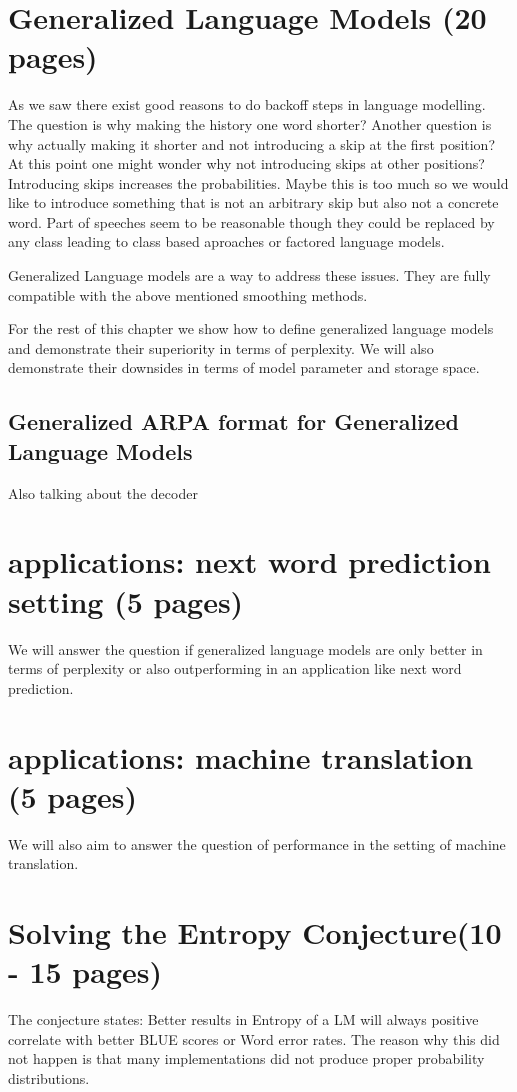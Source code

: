 \documentclass[•]{book}
\begin{document}
\chapter{Generalized Language Models (20 pages)}
As we saw there exist good reasons to do backoff steps in language modelling. 
The question is why making the history one word shorter?
Another question is why actually making it shorter and not introducing a skip at the first position?
At this point one might wonder why not introducing skips at other positions? 
Introducing skips increases the probabilities. 
Maybe this is too much so we would like to introduce something that is not an arbitrary skip but also not a concrete word. Part of speeches seem to be reasonable though they could be replaced by any class leading to class based aproaches\cite{CLASS:BASED:LMS} or factored language models\cite{FACTORED:LANGUAGE:MODEL}.

Generalized Language models are a way to address these issues. 
They are fully compatible with the above mentioned smoothing methods. 

For the rest of this chapter we show how to define generalized language models and demonstrate their superiority in terms of perplexity. 
We will also demonstrate their downsides in terms of model parameter and storage space.

\section{Generalized ARPA format for Generalized Language Models}
Also talking about the decoder

\chapter{applications: next word prediction setting (5 pages)}
We will answer the question if generalized language models are only better in terms of perplexity or also outperforming in an application like next word prediction.
\chapter{applications: machine translation (5 pages)}
We will also aim to answer the question of performance in the setting of machine translation.
\chapter{Solving the Entropy Conjecture(10 - 15 pages)}
The conjecture states: Better results in Entropy of a LM will always positive correlate with better BLUE scores or Word error rates. The reason why this did not happen is that many implementations did not produce proper probability distributions.
\end{document}
